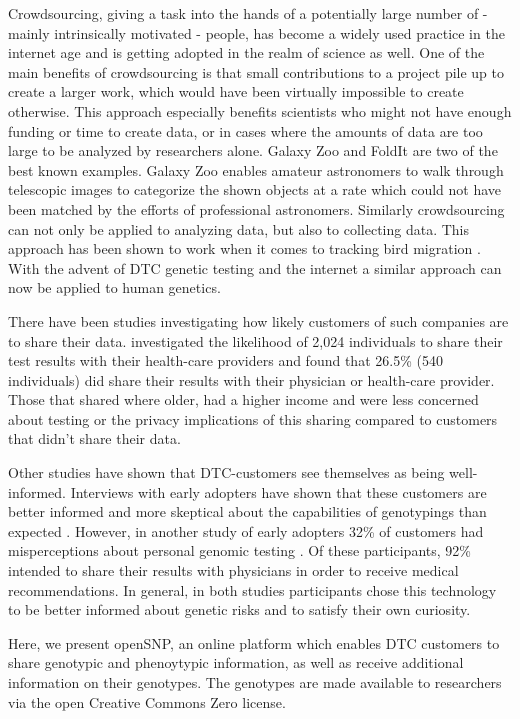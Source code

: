 \documentclass[10pt]{article}
\begin{document}
Crowdsourcing, giving a task into the hands of a potentially large number of - mainly intrinsically motivated - people, has become a widely used practice in the internet age and is getting adopted in the realm of science as well. One of the main benefits of crowdsourcing is that small contributions to a project pile up to create a larger work, which would have been virtually impossible to create otherwise. This approach especially benefits scientists who might not have enough funding or time to create data, or in cases where the amounts of data are too large to be analyzed by researchers alone.
 Galaxy Zoo and FoldIt \cite{Eiben2012, GalaxyZoo} are two of the best known examples. 
Galaxy Zoo enables amateur astronomers to walk through telescopic images to categorize the shown objects at a rate which could not have been matched by the efforts of professional astronomers.
Similarly crowdsourcing can not only be applied to analyzing data, but also to collecting data. This approach has been shown to work when it comes to tracking bird migration \cite{CrowdsourcingReview2010}. With the advent of DTC genetic testing and the internet a similar approach can now be applied to human genetics.

There have been studies investigating how likely customers of such companies are to share their data. \cite{Darst2013} investigated the likelihood of 2,024 individuals to share their test results with their health-care providers and found that 26.5\% (540 individuals) did share their results with their physician or health-care provider. Those that shared where older, had a higher income and were less concerned about testing or the privacy implications of this sharing compared to customers that didn't share their data.

Other studies have shown that DTC-customers see themselves as being well-informed. Interviews with early adopters have shown that these customers are better informed and more skeptical about the capabilities of genotypings than expected \cite{McGowan2010}. However, in another study of early adopters 32\% of customers had misperceptions about personal genomic testing \cite{Gollust2012}. Of these participants, 92\% intended to share their results with physicians in order to receive medical recommendations. In general, in both studies participants chose this technology to be better informed about genetic risks and to satisfy their own curiosity. 

Here, we present 
openSNP, an online platform which enables DTC customers to share genotypic and phenoytypic information, as well as receive additional information on their genotypes. The genotypes are made available to researchers via the open Creative Commons Zero license.
\end{document}
